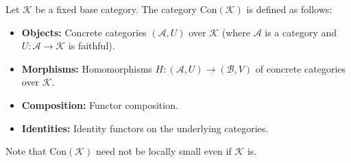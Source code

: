 Let $\mathcal{K}$ be a fixed base category. The category $\text{Con}(\mathcal{K})$ is defined as follows:
\begin{itemize}
  \item \textbf{Objects:} Concrete categories $(\mathcal{A}, U)$ over $\mathcal{K}$ (where $\mathcal{A}$ is a category and $U: \mathcal{A} \to \mathcal{K}$ is faithful).
  \item \textbf{Morphisms:} Homomorphisms $H: (\mathcal{A}, U) \to (\mathcal{B}, V)$ of concrete categories over $\mathcal{K}$.
  \item \textbf{Composition:} Functor composition.
  \item \textbf{Identities:} Identity functors on the underlying categories.
\end{itemize}
Note that $\text{Con}(\mathcal{K})$ need not be locally small even if $\mathcal{K}$ is.
